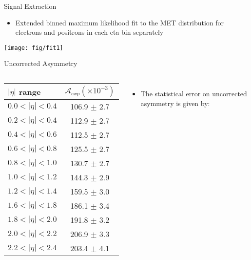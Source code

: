 \documentclass[8pt]{beamer}
\begin{document}
\begin{frame}{Signal Extraction}
  \begin{itemize}
    \item Extended binned maximum likelihood fit to the MET distribution for
    electrons and positrons in each eta bin separately
  \end{itemize}
    \begin{center}
      \texttt{[image: fig/fit1]}
    \end{center}
\end{frame}

\begin{frame}{Uncorrected Asymmetry}
  \begin{columns}[c]

   \begin{table}[h]
     \begin{center}
       \begin{tabular}{|l|c|}
       \hline
       $|\eta|$ range & $\mathcal{A}_{exp} (\times 10^{-3})$\\
       \hline    
       \hline
       $0.0<|\eta|<0.4$ & 106.9 $\pm$ 2.7\\
       $0.2<|\eta|<0.4$ & 112.9 $\pm$ 2.7\\
       $0.4<|\eta|<0.6$ & 112.5 $\pm$ 2.7\\
       $0.6<|\eta|<0.8$ & 125.5 $\pm$ 2.7\\
       $0.8<|\eta|<1.0$ & 130.7 $\pm$ 2.7\\
       $1.0<|\eta|<1.2$ & 144.3 $\pm$ 2.9\\
       $1.2<|\eta|<1.4$ & 159.5 $\pm$ 3.0 \\
       $1.6<|\eta|<1.8$ & 186.1 $\pm$ 3.4\\
       $1.8<|\eta|<2.0$ & 191.8 $\pm$ 3.2\\
       $2.0<|\eta|<2.2$ & 206.9 $\pm$ 3.3\\
       $2.2<|\eta|<2.4$ & 203.4 $\pm$ 4.1\\
       \hline
       \end{tabular}
     \end{center}
   \end{table}
  \begin{itemize}
  \item The statistical error on uncorrected asymmetry is given by:


\end{itemize}
\end{columns}
\end{frame}
\end{document}
